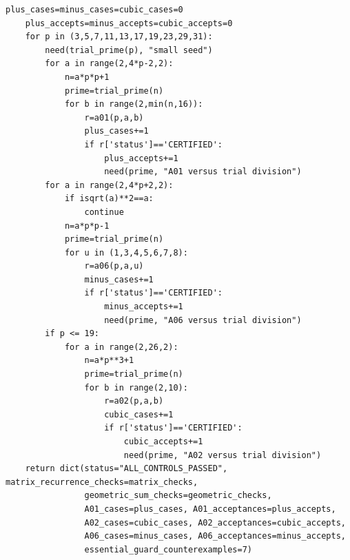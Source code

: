 \documentclass[11pt,a4paper]{article}
\theoremstyle{definition}\newtheorem{definition}[theorem]{Definition}
\theoremstyle{remark}\newtheorem{remark}[theorem]{Remark}
\begin{document}
\begin{lstlisting}[label=lst:constructions]
    plus_cases=minus_cases=cubic_cases=0
    plus_accepts=minus_accepts=cubic_accepts=0
    for p in (3,5,7,11,13,17,19,23,29,31):
        need(trial_prime(p), "small seed")
        for a in range(2,4*p-2,2):
            n=a*p*p+1
            prime=trial_prime(n)
            for b in range(2,min(n,16)):
                r=a01(p,a,b)
                plus_cases+=1
                if r['status']=='CERTIFIED':
                    plus_accepts+=1
                    need(prime, "A01 versus trial division")
        for a in range(2,4*p+2,2):
            if isqrt(a)**2==a:
                continue
            n=a*p*p-1
            prime=trial_prime(n)
            for u in (1,3,4,5,6,7,8):
                r=a06(p,a,u)
                minus_cases+=1
                if r['status']=='CERTIFIED':
                    minus_accepts+=1
                    need(prime, "A06 versus trial division")
        if p <= 19:
            for a in range(2,26,2):
                n=a*p**3+1
                prime=trial_prime(n)
                for b in range(2,10):
                    r=a02(p,a,b)
                    cubic_cases+=1
                    if r['status']=='CERTIFIED':
                        cubic_accepts+=1
                        need(prime, "A02 versus trial division")
    return dict(status="ALL_CONTROLS_PASSED", matrix_recurrence_checks=matrix_checks,
                geometric_sum_checks=geometric_checks,
                A01_cases=plus_cases, A01_acceptances=plus_accepts,
                A02_cases=cubic_cases, A02_acceptances=cubic_accepts,
                A06_cases=minus_cases, A06_acceptances=minus_accepts,
                essential_guard_counterexamples=7)



\end{lstlisting}
\end{document}
